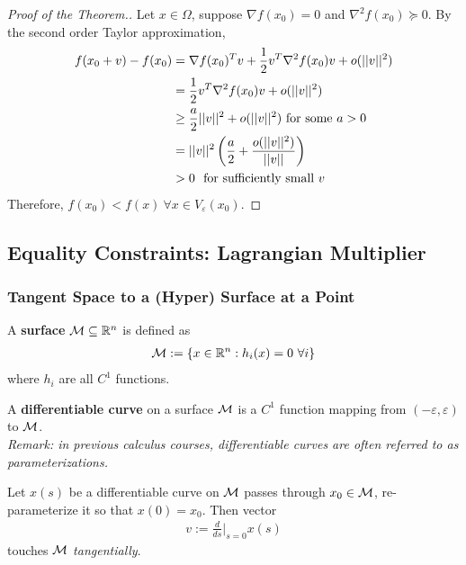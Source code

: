 \documentclass{article}
\begin{document}
   	\begin{proof}[Proof of the Theorem.]
   		Let $x \in \Omega$, suppose $\nabla f(x_0) = 0$ and $\nabla^2 f(x_0) \succcurlyeq 0$. By the second order Taylor approximation,
   		\begin{align}
   			f(x_0 + v) - f(x_0) &= \nabla f(x_0)^T v + \frac{1}{2} v^T \nabla^2 f(x_0) v + o(\vert \vert {v} \vert \vert^2) \\
   			&= \frac{1}{2} v^T \nabla^2 f(x_0) v + o(\vert \vert {v} \vert \vert^2) \\
   			&\geq \frac{a}{2} \vert \vert {v} \vert \vert^2 + o(\vert \vert {v} \vert \vert^2) \text{{ for some }}a > 0 \\
   			&= \vert \vert {v} \vert \vert^2 \left (
   			\frac{a}{2} + \frac{o(\vert \vert {v} \vert \vert^2)}{\vert \vert {v} \vert \vert} \right) \\
   			&>0\ \text{{ for sufficiently small }} v
   		\end{align}
   		Therefore, $f(x_0) < f(x)\ \forall x \in V_\varepsilon(x_0)$.
   	\end{proof}
   	
   	\subsection{Equality Constraints: Lagrangian Multiplier}
   	\subsubsection{Tangent Space to a (Hyper) Surface at a Point}
   	\begin{definition}
   		A \textbf{surface} $\mathcal{{M}} \subseteq \mathbb{R}^n$ is defined as
   		\begin{align}
   			\mathcal{{M}} := \left \{
   			x \in \mathbb{R}^n : h_i (x) = 0\ \forall i
   			\right \}
   		\end{align}
   		where $h_i$ are all $C^1$ functions.
   	\end{definition}
   	
   	\begin{definition}
   		A \textbf{differentiable curve} on a surface $\mathcal{{M}}$ is a $C^1$ function mapping from $(-\varepsilon, \varepsilon)$ to $\mathcal{{M}}$. \\
   		\emph{Remark: in previous calculus courses, differentiable curves are often referred to as parameterizations.}
   	\end{definition}
   	Let $x(s)$ be a differentiable curve on $\mathcal{{M}}$ passes through $x_0 \in \mathcal{{M}}$, re-parameterize it so that $x(0) = x_0$. Then vector
   	\begin{align}
   		v := \frac{d}{ds} \bigg \vert_{s=0} x(s)
   	\end{align}
   	touches $\mathcal{{M}}$ \emph{tangentially}.
   	
\end{document}
